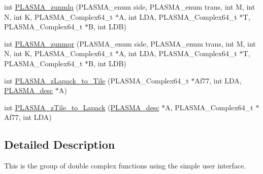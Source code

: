 \begin{DoxyCompactItemize}
\item 
int \hyperlink{group__PLASMA__Complex64__t_gae34adef35948b9dfbb683f94a8d4f70e_gae34adef35948b9dfbb683f94a8d4f70e}{PLASMA\_\-zunmlq} (PLASMA\_\-enum side, PLASMA\_\-enum trans, int M, int N, int K, PLASMA\_\-Complex64\_\-t $\ast$A, int LDA, PLASMA\_\-Complex64\_\-t $\ast$T, PLASMA\_\-Complex64\_\-t $\ast$B, int LDB)
\item 
int \hyperlink{group__PLASMA__Complex64__t_ga938e8d7780d4a578fe926e3e146462ca_ga938e8d7780d4a578fe926e3e146462ca}{PLASMA\_\-zunmqr} (PLASMA\_\-enum side, PLASMA\_\-enum trans, int M, int N, int K, PLASMA\_\-Complex64\_\-t $\ast$A, int LDA, PLASMA\_\-Complex64\_\-t $\ast$T, PLASMA\_\-Complex64\_\-t $\ast$B, int LDB)
\item 
int \hyperlink{group__PLASMA__Complex64__t_ga54817e0733e678bcdfdfeaa76ab486f6_ga54817e0733e678bcdfdfeaa76ab486f6}{PLASMA\_\-zLapack\_\-to\_\-Tile} (PLASMA\_\-Complex64\_\-t $\ast$Af77, int LDA, \hyperlink{typeplasma__desc__t}{PLASMA\_\-desc} $\ast$A)
\item 
int \hyperlink{group__PLASMA__Complex64__t_ga8df0b9fdc5537a648d7544b528c9e6e3_ga8df0b9fdc5537a648d7544b528c9e6e3}{PLASMA\_\-zTile\_\-to\_\-Lapack} (\hyperlink{typeplasma__desc__t}{PLASMA\_\-desc} $\ast$A, PLASMA\_\-Complex64\_\-t $\ast$Af77, int LDA)
\end{DoxyCompactItemize}


\subsection{Detailed Description}
This is the group of double complex functions using the simple user interface. 

